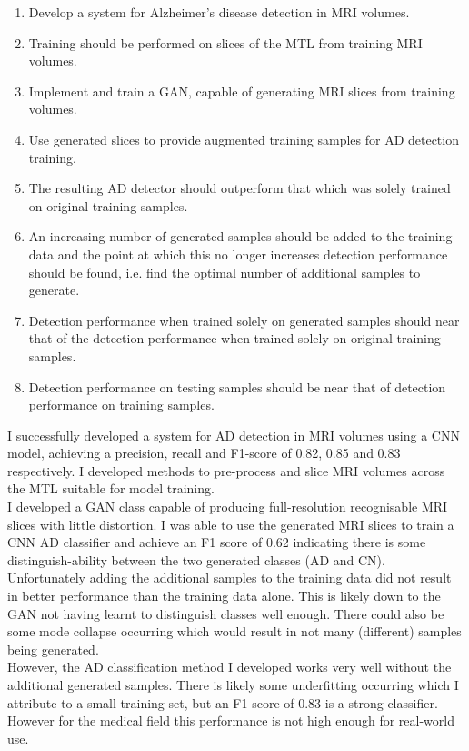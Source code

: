 \documentclass[
    author={Kai Hulme},
    supervisor={Dr Jon Bird},
    degree={BSc},
    title={Generative Adversarial Networks as an Augmentation Technique},
    subtitle={for Alzheimer's Disease Detection in MRI Volumes},
    type={Research},
    year={2021} 
]{dissertation}
\begin{document}
 \begin{enumerate}
    \setlength\itemsep{0em}
    \item Develop a system for Alzheimer's disease detection in MRI volumes.
    \item Training should be performed on slices of the MTL from training MRI volumes. 
    \item Implement and train a GAN, capable of generating MRI slices from training volumes.
    \item Use generated slices to provide augmented training samples for AD detection training.
    \item The resulting AD detector should outperform that which was solely trained on original training samples.
    \item An increasing number of generated samples should be added to the training data and the point at which this no longer increases detection performance should be found, i.e. find the optimal number of additional samples to generate.
    \item Detection performance when trained solely on generated samples should near that of the detection performance when trained solely on original training samples.
    \item Detection performance on testing samples should be near that of detection performance on training samples.
\end{enumerate}

I successfully developed a system for AD detection in MRI volumes using a CNN model, achieving a precision, recall and F1-score of 0.82, 0.85 and 0.83 respectively. I developed methods to pre-process and slice MRI volumes across the MTL suitable for model training. \\

I developed a GAN class capable of producing full-resolution recognisable MRI slices with little distortion. I was able to use the generated MRI slices to train a CNN AD classifier and achieve an F1 score of 0.62 indicating there is some distinguish-ability between the two generated classes (AD and CN). Unfortunately adding the additional samples to the training data did not result in better performance than the training data alone. This is likely down to the GAN not having learnt to distinguish classes well enough. There could also be some mode collapse occurring which would result in not many (different) samples being generated. \\

However, the AD classification method I developed works very well without the additional generated samples. There is likely some underfitting occurring which I attribute to a small training set, but an F1-score of 0.83 is a strong classifier. However for the medical field this performance is not high enough for real-world use. \\
\end{document}
